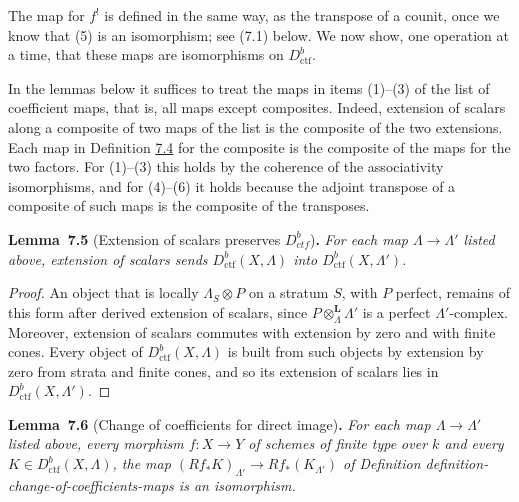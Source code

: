 \documentclass[11pt]{article}
\newenvironment{bpstatement}[2]{\par\addvspace{0.6\baselineskip}\noindent\textbf{#1}#2\textbf{.}\enspace\ignorespaces}
  {\par\addvspace{0.4\baselineskip}}
\newenvironment{bpstatementit}[2]{\begin{bpstatement}{#1}{#2}\itshape\ignorespaces}{\end{bpstatement}}
\providecommand{\Dctf}{}\renewcommand{\Dctf}{D^b_{ctf}}
\begin{document}
\label{bp613}%
The map for \(f^!\) is defined in the same way, as the transpose of a counit, once we know that (5) is an isomorphism; see (7.1) below. We now show, one operation at a time, that these maps are isomorphisms on \(D^b_{\mathrm{ctf}}\).

In the lemmas below it suffices to treat the maps in items (1)–(3) of the list of coefficient maps, that is, all maps except composites. Indeed, extension of scalars along a composite of two maps of the list is the composite of the two extensions. Each map in Definition \hyperref[bp612]{7.4} for the composite is the composite of the maps for the two factors. For (1)–(3) this holds by the coherence of the associativity isomorphisms, and for (4)–(6) it holds because the adjoint transpose of a composite of such maps is the composite of the transposes.

\label{bp614}%
\begin{bpstatementit}{Lemma~7.5}{ (Extension of scalars preserves $\Dctf$)}
For each map \(\Lambda\to\Lambda'\) listed above, extension of scalars sends \(D^b_{\mathrm{ctf}}(X,\Lambda)\) into \(D^b_{\mathrm{ctf}}(X,\Lambda')\).
\end{bpstatementit}

\begin{proof}[{Proof}]\label{bp615}%
An object that is locally \(\Lambda_S\otimes P\) on a stratum \(S\), with \(P\) perfect, remains of this form after derived extension of scalars, since \(P\otimes^{\mathbf L}_\Lambda\Lambda'\) is a perfect \(\Lambda'\)-complex. Moreover, extension of scalars commutes with extension by zero and with finite cones. Every object of \(D^b_{\mathrm{ctf}}(X,\Lambda)\) is built from such objects by extension by zero from strata and finite cones, and so its extension of scalars lies in \(D^b_{\mathrm{ctf}}(X,\Lambda')\).
\end{proof}

\label{bp616}%
\begin{bpstatementit}{Lemma~7.6}{ (Change of coefficients for direct image)}
For each map \(\Lambda\to\Lambda'\) listed above, every morphism \(f:X\to Y\) of schemes of finite type over \(k\) and every \(K\in D^b_{\mathrm{ctf}}(X,\Lambda)\), the map \((Rf_*K)_{\Lambda'}\to Rf_*(K_{\Lambda'})\) of Definition definition-change-of-coefficients-maps is an isomorphism.
\end{bpstatementit}
\end{document}
